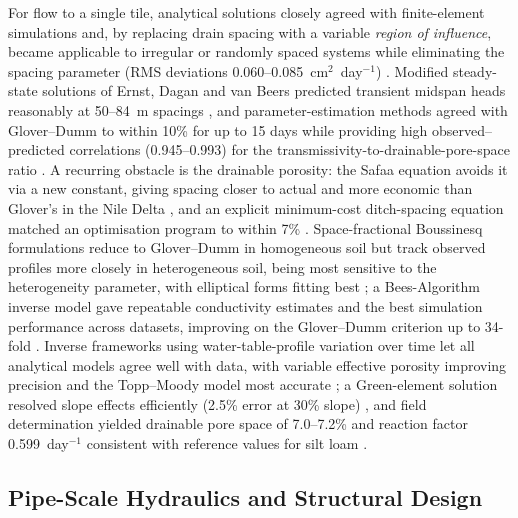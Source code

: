 For flow to a single tile, analytical solutions closely agreed with finite-element simulations and, by replacing drain spacing with a variable \emph{region of influence}, became applicable to irregular or randomly spaced systems while eliminating the spacing parameter (RMS deviations 0.060--0.085~cm$^2$~day$^{-1}$) \parencite{Cooke2001}. Modified steady-state solutions of Ernst, Dagan and van Beers predicted transient midspan heads reasonably at 50--84~m spacings \parencite{SINGH1992}, and parameter-estimation methods agreed with Glover--Dumm to within 10\% for up to 15 days while providing high observed--predicted correlations (0.945--0.993) for the transmissivity-to-drainable-pore-space ratio \parencite{KUMAR1994}. A recurring obstacle is the drainable porosity: the Safaa equation avoids it via a new constant, giving spacing closer to actual and more economic than Glover's in the Nile Delta \parencite{FathAllah2025}, and an explicit minimum-cost ditch-spacing equation matched an optimisation program to within 7\% \parencite{Chahar2010}. Space-fractional Boussinesq formulations reduce to Glover--Dumm in homogeneous soil but track observed profiles more closely in heterogeneous soil, being most sensitive to the heterogeneity parameter, with elliptical forms fitting best \parencite{Mehdinejadiani2013,Mehdinejadiani2020}; a Bees-Algorithm inverse model gave repeatable conductivity estimates and the best simulation performance across datasets, improving on the Glover--Dumm criterion up to 34-fold \parencite{Mehdinejadiani2022}. Inverse frameworks using water-table-profile variation over time let all analytical models agree well with data, with variable effective porosity improving precision and the Topp--Moody model most accurate \parencite{Samani2007}; a Green-element solution resolved slope effects efficiently (2.5\% error at 30\% slope) \parencite{Onyejekwe1999}, and field determination yielded drainable pore space of 7.0--7.2\% and reaction factor 0.599~day$^{-1}$ consistent with reference values for silt loam \parencite{Bahceci2008}.

\subsection{Pipe-Scale Hydraulics and Structural Design}

